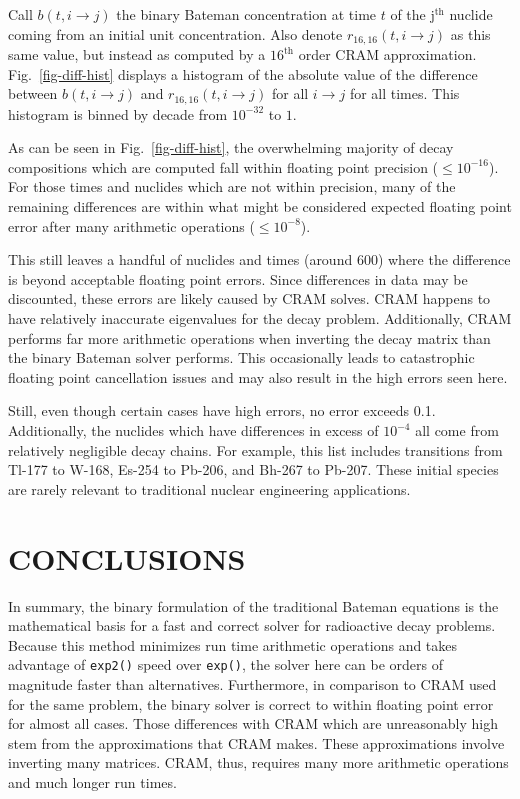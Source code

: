 \documentclass[letterpaper]{physor2018}
\newcommand{\jth}{j$^{\mathrm{th}}$\xspace}
\begin{document}
Call $b(t, i\to j)$ the binary Bateman concentration at time $t$ of the \jth nuclide
coming from an initial unit concentration.
Also denote $r_{16,16}(t, i\to j)$ as this same value, but instead as computed
by a $16^{\mathrm{th}}$ order CRAM approximation. Fig.~\ref{fig-diff-hist}
displays a histogram of the absolute value of the difference between
$b(t, i\to j)$ and $r_{16,16}(t, i\to j)$ for all $i \to j$ for all times.
This histogram is binned by decade from $10^{-32}$ to $1$.

As can be seen in Fig.~\ref{fig-diff-hist}, the overwhelming majority of
decay compositions which are computed fall within floating point precision
($\le 10^{-16}$). For those times and nuclides which are not within precision,
many of the remaining differences are within what might be considered
expected floating point error after many arithmetic operations ($\le 10^{-8}$).

This still leaves a handful of nuclides and times (around 600)
where the difference is beyond acceptable floating point errors. Since differences
in data may be discounted, these errors are likely caused by CRAM solves.
CRAM happens to have relatively inaccurate eigenvalues for the decay problem. Additionally,
CRAM performs
far more arithmetic operations when inverting the decay matrix than the binary Bateman
solver performs. This occasionally leads to catastrophic floating point cancellation
issues and may also result in the high errors seen here.

Still, even though certain cases have high errors, no error exceeds 0.1.
Additionally, the nuclides which have differences in excess of $10^{-4}$
all come from relatively negligible decay chains. For example, this
list includes transitions from Tl-177 to W-168, Es-254 to
Pb-206, and Bh-267 to Pb-207. These initial species are rarely relevant
to traditional nuclear engineering applications.


\section{CONCLUSIONS}
\label{sec-conc}

In summary, the binary formulation of the traditional Bateman equations
is the mathematical basis for a fast and correct solver for radioactive decay problems. Because this
method minimizes run time arithmetic operations and takes advantage of
\texttt{exp2()} speed over \texttt{exp()}, the solver here can be orders of
magnitude faster than alternatives. Furthermore, in comparison to CRAM used
for the same problem, the binary solver is correct to within floating point
error for almost all cases. Those differences with CRAM which are
unreasonably high stem from the approximations that CRAM makes. These
approximations involve inverting many matrices. CRAM, thus, requires many
more arithmetic operations and much longer run times.
\end{document}
